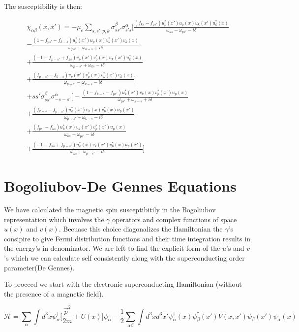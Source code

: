 \documentclass{article}
\begin{document}
The susceptibility is then:

\begin{align*}
\chi_{\alpha\beta}(x,x')=-\mu_e\sum\limits_{s,s',p,k}\sigma^\beta_{ss'}\sigma^\alpha_{s's}\bigg[\frac{(f_{ks}-f_{ps'})u^*_p(x')u_p(x)u_k(x')u^*_k(x)}{\omega_{ks}-\omega_{ps'}-i\delta} \\
-\frac{(1-f_{ps'}-f_{k-s})u^*_p(x')u_p(x)v^*_k(x')v_k(x)}{\omega_{ps'}+\omega_{k-s}+i\delta} \\
+\frac{(-1+f_{p-s'}+f_{ks})v_p(x')v^*_p(x)u_k(x')u^*_k(x)}{\omega_{p-s'}+\omega_{ks}-i\delta} \\
+\frac{(f_{p-s'}-f_{k-s})v_p(x')v^*_p(x)v^*_k(x')v_k(x)}{\omega_{p-s'}-\omega_{k-s}-i\delta}\bigg] \\
+ss'\sigma^\beta_{ss'}\sigma^\alpha_{-s-s'}\bigg[-\frac{(1-f_{k-s}-f_{ps'})u^*_k(x')v_k(x)v^*_p(x')u_p(x)}{\omega_{ps'}+\omega_{k-s}+i\delta} \\
+\frac{(f_{k-s}-f_{p-s'})u^*_k(x')v_k(x)v^*_p(x)u_p(x')}{\omega_{p-s'}-\omega_{k-s}-i\delta} \\
+\frac{(f_{ps'}-f_{ks})u^*_k(x)v_k(x')v^*_p(x')u_p(x)}{\omega_{ks}-\omega_{ps'}-i\delta} \\
+\frac{(-1+f_{ks}+f_{p-s'})u^*_k(x)v_k(x')v^*_p(x)u_p(x')}{\omega_{ks}+\omega_{p-s'}-i\delta}\bigg]
\end{align*}

\section*{Bogoliubov-De Gennes Equations}
We have calculated the magnetic spin susceptibitily in the Bogoliubov representation which involves the $\gamma$ operators and complex functions of space $u(x)$ and $v(x)$. Becuase this choice diagonalizes the Hamiltonian the $\gamma$'s consipire to give Fermi distribution functions and their time integration results in the energy's in denominator. We are left to find the explicit form of the $u$'s and $v$'s which we can calculate self consistently along with the superconducting order parameter(De Gennes).

To proceed we start with the electronic superconducting Hamiltonian (without the presence of a magnetic field).

\begin{equation*}
\mathcal{H}=\sum\limits_{\alpha}\int d^3x \psi^\dagger_\alpha\bigg[\frac{\vec{p}^2}{2m}+U(x)\bigg]\psi_\alpha-\frac{1}{2}\sum\limits_{\alpha\beta}\int d^3x d^3x' \psi^\dagger_\alpha(x)\psi^\dagger_\beta(x') V(x,x')\psi_\beta(x')\psi_\alpha(x)
\end{equation*}
\end{document}
